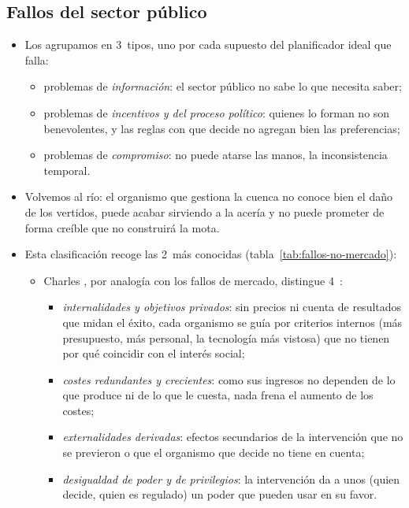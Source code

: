 \documentclass[11pt]{article}
\begin{document}
\subsection{Fallos del sector público}\label{sec:fallos-sp}

\begin{itemize}
\item Los agrupamos en 3~tipos, uno por cada supuesto del planificador ideal que falla:
  \begin{itemize}
  \item problemas de \emph{información}: el sector público no sabe lo que necesita saber;
  \item problemas de \emph{incentivos y del proceso político}: quienes lo forman no son benevolentes, y las reglas con que decide no agregan bien las preferencias;
  \item problemas de \emph{compromiso}: no puede atarse las manos, la inconsistencia temporal.
  \end{itemize}
\item Volvemos al río: el organismo que gestiona la cuenca no conoce bien el daño de los vertidos, puede acabar sirviendo a la acería y no puede prometer de forma creíble que no construirá la mota.
\item Esta clasificación recoge las 2~más conocidas (tabla~\ref{tab:fallos-no-mercado}):
  \begin{itemize}
  \item Charles \textcite{Wolf1979Theory}, por analogía con los fallos de mercado, distingue 4~:
    \begin{itemize}
    \item \emph{internalidades y objetivos privados}: sin precios ni cuenta de resultados que midan el éxito, cada organismo se guía por criterios internos (más presupuesto, más personal, la tecnología más vistosa) que no tienen por qué coincidir con el interés social;
    \item \emph{costes redundantes y crecientes}: como sus ingresos no dependen de lo que produce ni de lo que le cuesta, nada frena el aumento de los costes;
    \item \emph{externalidades derivadas}: efectos secundarios de la intervención que no se previeron o que el organismo que decide no tiene en cuenta;
    \item \emph{desigualdad de poder y de privilegios}: la intervención da a unos (quien decide, quien es regulado) un poder que pueden usar en su favor.
    \end{itemize}

\end{itemize}
\end{itemize}
\end{document}

